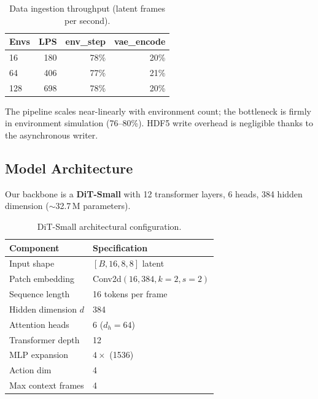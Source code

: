 \documentclass[letterpaper,twocolumn,10pt]{article}
\begin{document}
\begin{table}[t]
\centering
\caption{Data ingestion throughput (latent frames per second).}
\label{tab:ingest}
\begin{tabular}{@{}lrrr@{}}
\toprule
\textbf{Envs} & \textbf{LPS} & \textbf{env\_step} & \textbf{vae\_encode} \\
\midrule
16  & 180 & 78\% & 20\% \\
64  & 406 & 77\% & 21\% \\
128 & 698 & 78\% & 20\% \\
\bottomrule
\end{tabular}
\end{table}

The pipeline scales near-linearly with environment count; the bottleneck
is firmly in environment simulation (76--80\%). HDF5 write overhead is negligible thanks to the asynchronous writer.

\subsection{Model Architecture}

Our backbone is a \textbf{DiT-Small} with 12 transformer layers, 6 heads, 384 hidden dimension ($\sim$32.7\,M parameters).

\begin{table}[t]
\centering
\caption{DiT-Small architectural configuration.}
\label{tab:arch}
\begin{tabular}{@{}ll@{}}
\toprule
\textbf{Component} & \textbf{Specification} \\
\midrule
Input shape & $[B, 16, 8, 8]$ latent \\
Patch embedding & Conv2d$(16,384,k{=}2,s{=}2)$ \\
Sequence length & 16 tokens per frame \\
Hidden dimension $d$ & 384 \\
Attention heads & 6 ($d_h{=}64$) \\
Transformer depth & 12 \\
MLP expansion & $4\times$ (1536) \\
Action dim & 4 \\
Max context frames & 4 \\
\bottomrule
\end{tabular}
\end{table}
\end{document}
